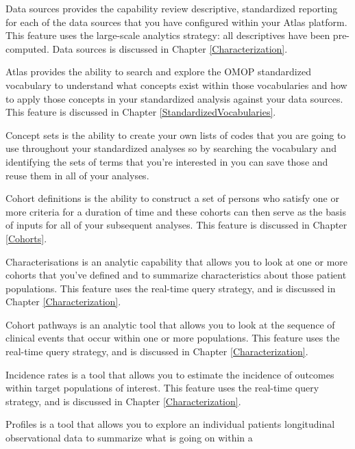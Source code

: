 \documentclass[11pt]{book}
\providecommand{\tightlist}{%
  \setlength{\itemsep}{0pt}\setlength{\parskip}{0pt}}
\begin{document}
\begin{description}
\tightlist
\item[Data Sources]
Data sources provides the capability review descriptive, standardized
reporting for each of the data sources that you have configured within
your Atlas platform. This feature uses the large-scale analytics
strategy: all descriptives have been pre-computed. Data sources is
discussed in Chapter \ref{Characterization}.
\item[Vocabulary Search]
Atlas provides the ability to search and explore the OMOP standardized
vocabulary to understand what concepts exist within those vocabularies
and how to apply those concepts in your standardized analysis against
your data sources. This feature is discussed in Chapter
\ref{StandardizedVocabularies}.
\item[Concept Sets]
Concept sets is the ability to create your own lists of codes that you
are going to use throughout your standardized analyses so by searching
the vocabulary and identifying the sets of terms that you're interested
in you can save those and reuse them in all of your analyses.
\item[Cohort Definitions]
Cohort definitions is the ability to construct a set of persons who
satisfy one or more criteria for a duration of time and these cohorts
can then serve as the basis of inputs for all of your subsequent
analyses. This feature is discussed in Chapter \ref{Cohorts}.
\item[Characterizations]
Characterisations is an analytic capability that allows you to look at
one or more cohorts that you've defined and to summarize characteristics
about those patient populations. This feature uses the real-time query
strategy, and is discussed in Chapter \ref{Characterization}.
\item[Cohort Pathways]
Cohort pathways is an analytic tool that allows you to look at the
sequence of clinical events that occur within one or more populations.
This feature uses the real-time query strategy, and is discussed in
Chapter \ref{Characterization}.
\item[Incidence Rates]
Incidence rates is a tool that allows you to estimate the incidence of
outcomes within target populations of interest. This feature uses the
real-time query strategy, and is discussed in Chapter
\ref{Characterization}.
\item[Profiles]
Profiles is a tool that allows you to explore an individual patients
longitudinal observational data to summarize what is going on within a

\end{description}
\end{document}
